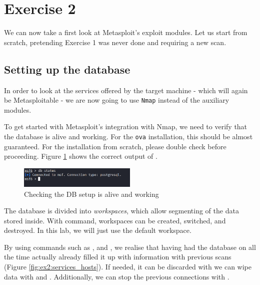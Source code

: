 \section{Exercise 2}
\label{sec:ex2}

We can now take a first look at Metasploit's exploit modules. Let us start from scratch, pretending Exercise 1 was never done and requiring a new scan.

\subsection{Setting up the database}
\label{subsec:ex2:setting-up-db}

In order to look at the services offered by the target machine - which will again be Metasploitable - we are now going to use \texttt{Nmap} instead of the auxiliary modules.

To get started with Metasploit's integration with Nmap, we need to verify that the database is alive and working. For the \texttt{ova} installation, this should be almost guaranteed. For the installation from scratch, please double check before proceeding. Figure \ref{fig:ex2:db_status} shows the correct output of .

\begin{figure}[htbp]
    \centering
    \includegraphics[width=0.5\textwidth]{../drawable/exercise_2_screenshots/db_status.png}
    \caption{Checking the DB setup is alive and working}
    \label{fig:ex2:db_status}
\end{figure}

The database is divided into \textit{workspaces}, which allow segmenting of the data stored inside. With  command, workspaces can be created, switched, and destroyed. In this lab, we will just use the default workspace.

By using commands such as , and , we realise that having had the database on all the time actually already filled it up with information with previous scans (Figure \ref{fig:ex2:services_hosts}). If needed, it can be discarded with we can wipe data with  and . Additionally, we can stop the previous connections with .

